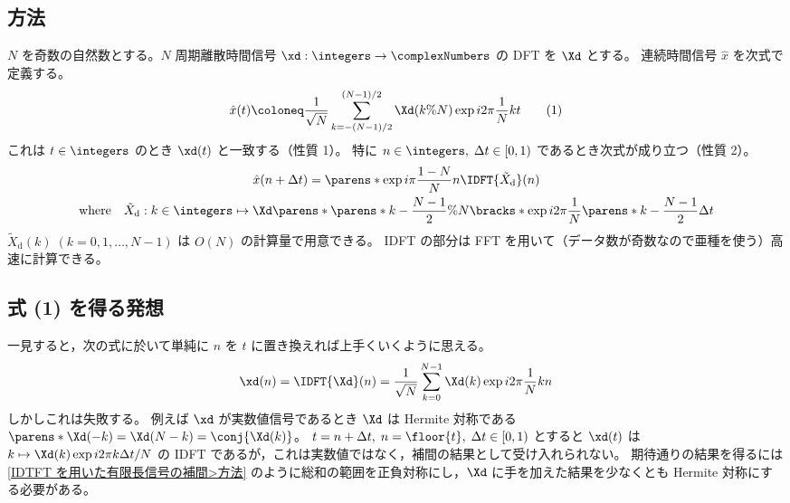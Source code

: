         \subsection{方法}
            \label{IDFT を用いた周期信号の補間>方法}
            \newcommand*{\Xtilded}{\tilde{X}_\text{d}}
            $N$ を奇数の自然数とする。$N$ 周期離散時間信号 $\xd:\integers\to\complexNumbers$ の DFT を $\Xd$ とする。
            連続時間信号 $\hat{x}$ を次式で定義する。
            \[ \hat{x}(t) \coloneq \frac{1}{\sqrt{N}}\sum_{k=-(N-1)/2}^{(N-1)/2}\Xd(k\%N)\exp i2\pi\frac{1}{N}kt \tag{1} \]
            これは $t\in\integers$ のとき $\xd(t)$ と一致する（性質 1）。
            特に $n\in\integers,\;\Delta t\in[0,1)$ であるとき次式が成り立つ（性質 2）。
            \begin{gather}
                \hat{x}(n+\Delta t) = \parens*{\exp i\pi\frac{1-N}{N}n}\IDFT{\Xtilded}(n) \label{IDFT を用いた周期信号の補間>公式}\\
                \text{where} \quad \Xtilded:k\in\integers\mapsto\Xd\parens*{\parens*{k-\frac{N-1}{2}}\%N}\bracks*{\exp i2\pi\frac{1}{N}\parens*{k-\frac{N-1}{2}}\Delta t} \nonumber
            \end{gather}
            $\Xtilded(k)\;(k=0,1,\dots,N-1)$ は $O(N)$ の計算量で用意できる。
            IDFT の部分は FFT を用いて（データ数が奇数なので亜種を使う）高速に計算できる。
        \subsection{式 (1) を得る発想}
            一見すると，次の式に於いて単純に $n$ を $t$ に置き換えれば上手くいくように思える。
            \[ \xd(n) = \IDFT{\Xd}(n) = \frac{1}{\sqrt{N}}\sum_{k=0}^{N-1}\Xd(k)\exp i2\pi\frac{1}{N}kn \]
            しかしこれは失敗する。
            例えば $\xd$ が実数値信号であるとき $\Xd$ は Hermite 対称である $\parens*{\Xd(-k)=\Xd(N-k)=\conj{\Xd(k)}}$。
            $t=n+\Delta t,\;n=\floor{t},\;\Delta t\in[0,1)$ とすると $\xd(t)$ は $k\mapsto\Xd(k)\exp i2\pi k\Delta t/N$ の IDFT であるが，これは実数値ではなく，補間の結果として受け入れられない。
            期待通りの結果を得るには \ref{IDTFT を用いた有限長信号の補間>方法} のように総和の範囲を正負対称にし，$\Xd$ に手を加えた結果を少なくとも Hermite 対称にする必要がある。
